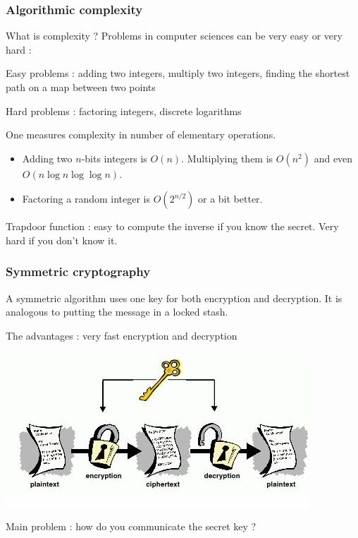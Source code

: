 \documentclass[compress]{beamer}
\theoremstyle{definition}
\theoremstyle{definition}
\theoremstyle{definition}
\theoremstyle{remark}
\theoremstyle{remark}
\theoremstyle{definition}
\theoremstyle{definition}
\theoremstyle{definition}
\theoremstyle{definition}
\theoremstyle{definition}
\theoremstyle{remark}
\theoremstyle{remark}
\theoremstyle{remark}
\theoremstyle{remark}
\begin{document}
				\subsubsection{Algorithmic complexity}
				\begin{frame}
					\begin{block}{What is complexity ?}
						Problems in computer sciences can be very easy or very hard :
						
						Easy problems : adding two integers, multiply two integers, finding the shortest path on a map between two points
						
						Hard problems : factoring integers, discrete logarithms
					\end{block}
					
					One measures complexity in number of elementary operations.
					\begin{itemize}
						\item Adding two $n$-bits integers is $O(n)$. Multiplying them is $O(n^2)$ and even $O(n \log n \log \log n)$.
						\item Factoring a random integer is $O(2^{n/2})$ or a bit better.
					\end{itemize}
					\vspace*{10mm}
					Trapdoor function : easy to compute the inverse if you know the secret. Very hard if you don't know it.
				\end{frame}
				\subsubsection{Symmetric cryptography}
				\begin{frame}
					A symmetric algorithm uses one key for both encryption and decryption. It is analogous to putting the message in a locked stash.
					
					The advantages : very fast encryption and decryption
					
					\begin{center}\includegraphics[scale=2]{./symmetric}\end{center}
					
					Main problem : \alert{how do you communicate the secret key ?}
				\end{frame}
\end{document}

